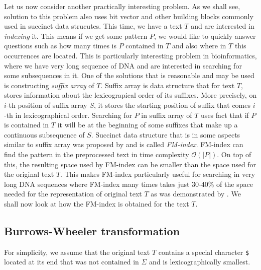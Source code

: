 Let us now consider another practically interesting problem. As we shall see, solution
to this problem also uses bit vector and other building blocks commonly used in succinct
data strucutes. This time, we have a text $T$ and are interested in \textit{indexing} it.
This means if we get some pattern $P$, we would like to quickly answer questions such as
how many times is $P$ contained in $T$ and also where in $T$ this occurrences are located.
This is particularly interesting problem in bioinformatics, where we have very long sequence
of DNA and are interested in searching for some subsequences in it. One of the solutions that
is reasonable and may be used is constructing \textit{suffix array} of $T$. Suffix array is
data structure that for text $T$, stores information about the lexicograpical order of its
suffixes. More precisely, on $i$-th position of suffix array $S$, it stores the starting
position of suffix that comes $i$-th in lexicographical order. Searching for $P$ in suffix
array of $T$ uses fact that if $P$ is contained in $T$ it will be at the beginning of some
suffixes that make up a continuous subsequence of $S$. Succinct data structure that is in
some aspects similar to suffix array was proposed by \cite{ferragina2000opportunistic} and
is called \textit{FM-index}. FM-index can find the pattern in the preprocessed text in time
complexity $\mathcal{O}(|P|)$. On top of this, the resulting space used by FM-index can be
smaller than the space used for the original text $T$. This makes FM-index particularly useful
for searching in very long DNA sequences where FM-index many times takes just 30-40\% of the
space needed for the representation of original text $T$ as was demonstrated by
\cite{ferragina2001experimental}. We shall now look at how the FM-index is obtained for the text
$T$.

\subsection{Burrows-Wheeler transformation}

For simplicity, we assume that the original text $T$ contains a special character {\tt \$}
located at its end that was not contained in $\Sigma$ and is lexicographically smallest.


